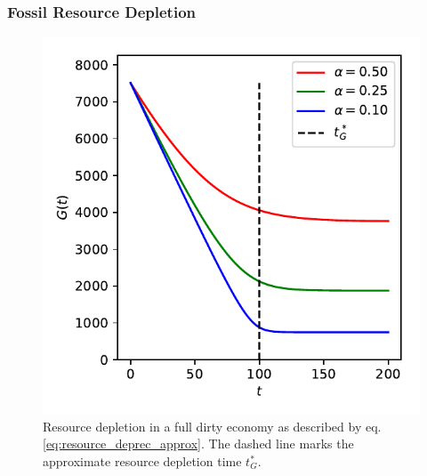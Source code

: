 \subsubsection{Fossil Resource Depletion}
\label{sec:resource_depletion}


\begin{figure}
    \vspace{-.8 cm}
    \hspace{-1.5cm}\includegraphics[width = .58 \textwidth]{figures/g_depletion.pdf}
    \caption[Resource depletion in a full dirty economy]{Resource depletion in a full dirty economy as described by eq. \eqref{eq:resource_deprec_approx}. The dashed line marks the approximate resource depletion time $t^*_G$. \label{fig:g_depletion}}
\end{figure}

